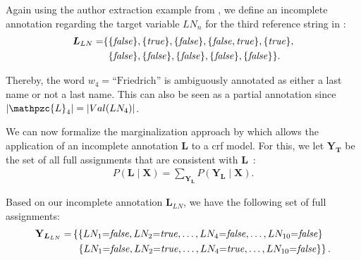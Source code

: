 Again using the author extraction example from , we define an incomplete annotation regarding the \gls{target variable} $LN_n$ for the third reference string in :
\begin{equation*}
\begin{split}
  \bm{L}_{LN}=&\{\{\mathit{false}\},\{\mathit{true}\},\{\mathit{false}\},\{\mathit{false},\mathit{true}\},\{\mathit{true}\},\\
  &\hphantom{\{}\{\mathit{false}\},\{\mathit{false}\},\{\mathit{false}\},\{\mathit{false}\},\{\mathit{false}\}\}.
\end{split}
\end{equation*}

Thereby, the word $w_4{=}\text{``Friedrich''}$ is ambiguously annotated as either a last name or not a last name.
This can also be seen as a \gls{partial annotation} since $|\mathpzc{L}_4|=|Val(LN_4)|$.

\bigskip

We can now formalize the marginalization approach by \citet{tsuboi2008training} which allows the application of an incomplete annotation $\bm{L}$ to a \gls{crf} model.
For this, we let $\mathbf{Y}_{\bm{T}}$ be the set of all \glspl{full assignment} that are consistent with $\bm{L}$~\citep{tsuboi2008training}:
\begin{equation}
  \label{equ:crf-marginalization}
  \begin{split}
    P\left(\bm{L}\mid\mathbf{X}\right)=\sum_{\mathbf{Y}_{\bm{L}}}P\left(\mathbf{Y}_{\bm{L}}\mid\mathbf{X}\right).
  \end{split}
\end{equation}

Based on our incomplete annotation $\bm{L}_{LN}$, we have the following set of \glspl{full assignment}:
\begin{equation*}
\begin{split}
  \mathbf{Y}_{\bm{L}_{LN}}=&\left\{\{LN_1{=}\mathit{false},LN_2{=}\mathit{true},\dots,LN_4{=}\mathit{false},\dots,LN_{10}{=}\mathit{false}\}\right.\\
  &\hspace{0.15cm}\left.\{LN_1{=}\mathit{false},LN_2{=}\mathit{true},\dots,LN_4{=}\mathit{true},\dots,LN_{10}{=}\mathit{false}\}\right\}.\\
\end{split}
\end{equation*}

